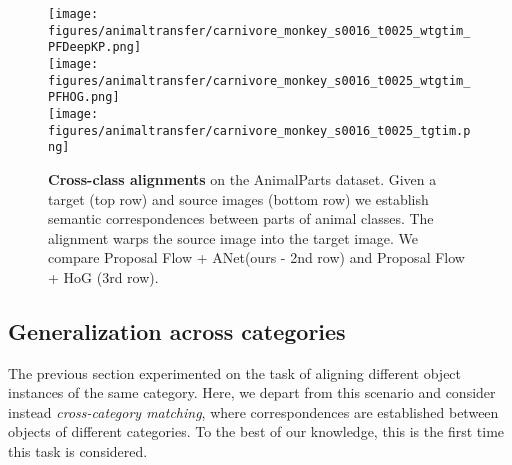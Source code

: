 \documentclass[10pt,twocolumn,letterpaper]{article}
\def\methodname{ANet\xspace}
\begin{document}
\begin{figure*}[t]
{{  \texttt{[image: figures/animaltransfer/carnivore\_monkey\_s0016\_t0025\_wtgtim\_PFDeepKP.png]}\vspace{0.2cm} \\
  \texttt{[image: figures/animaltransfer/carnivore\_monkey\_s0016\_t0025\_wtgtim\_PFHOG.png]}\vspace{0.2cm} \\
  \texttt{[image: figures/animaltransfer/carnivore\_monkey\_s0016\_t0025\_tgtim.png]} 
} }
 \caption{ \textbf{Cross-class alignments} on the AnimalParts dataset. Given a target (top row) and source images (bottom row)
we establish semantic correspondences between parts of animal classes. 
The alignment warps the source image into the target image.
We compare Proposal Flow + \methodname (ours - 2nd row) and Proposal Flow + HoG \cite{ham2016} (3rd row).
}
\label{fig:animalwarp}
\end{figure*}\subsection{Generalization across categories}\label{sec:expDA}The previous section experimented on the task of aligning different object instances of the same category.
Here, we depart from this scenario and consider instead \textit{cross-category matching},  where correspondences are established between objects of different categories. To the best of our knowledge, this is the first time this task is considered. 
\end{document}
